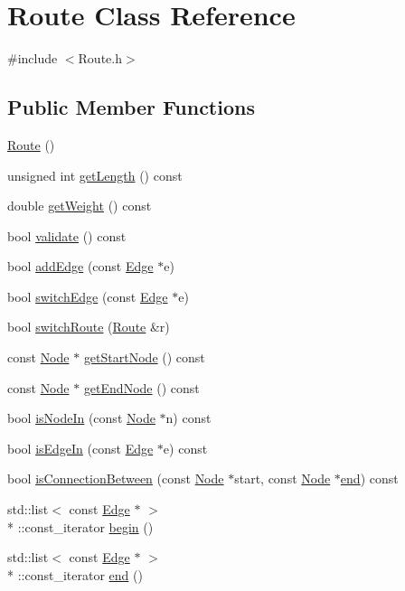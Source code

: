 \hypertarget{classRoute}{\section{Route Class Reference}
\label{classRoute}
}


{\ttfamily \#include $<$Route.\+h$>$}

\subsection*{Public Member Functions}
\begin{DoxyCompactItemize}
\item 
\hyperlink{classRoute_a2b1c971aaf032109cee8081c97e9b9e9}{Route} ()
\item 
unsigned int \hyperlink{classRoute_a105c4a307e39f001686fda75f86ab706}{get\+Length} () const 
\item 
double \hyperlink{classRoute_a29e42745f757af5e569da3a027cdb553}{get\+Weight} () const 
\item 
bool \hyperlink{classRoute_ab563e782ab31226e1aac4d8fabe2c54e}{validate} () const 
\item 
bool \hyperlink{classRoute_a49e8426003ed1372316ebf2f7c30bc10}{add\+Edge} (const \hyperlink{classEdge}{Edge} $\ast$e)
\item 
bool \hyperlink{classRoute_a36c62fabee1b7f0abe369963b5822b72}{switch\+Edge} (const \hyperlink{classEdge}{Edge} $\ast$e)
\item 
bool \hyperlink{classRoute_a5d04589bb4d49348d10eb953545f9a31}{switch\+Route} (\hyperlink{classRoute}{Route} \&r)
\item 
const \hyperlink{classNode}{Node} $\ast$ \hyperlink{classRoute_a4898ca33d504f3ac76967183e4bea3ca}{get\+Start\+Node} () const 
\item 
const \hyperlink{classNode}{Node} $\ast$ \hyperlink{classRoute_a58761414ce3ccbf662226f8513236941}{get\+End\+Node} () const 
\item 
bool \hyperlink{classRoute_abbc3d9f0eb9e4e867c61d59a1d1c5714}{is\+Node\+In} (const \hyperlink{classNode}{Node} $\ast$n) const 
\item 
bool \hyperlink{classRoute_a3743e49214c67c7aacc92bf3a064569e}{is\+Edge\+In} (const \hyperlink{classEdge}{Edge} $\ast$e) const 
\item 
bool \hyperlink{classRoute_ad29878261b38528b528cd499ab532169}{is\+Connection\+Between} (const \hyperlink{classNode}{Node} $\ast$start, const \hyperlink{classNode}{Node} $\ast$\hyperlink{classRoute_a9b0d7f619cd6f518e7e5d3532929b181}{end}) const 
\item 
std\+::list$<$ const \hyperlink{classEdge}{Edge} $\ast$ $>$\\*
\+::const\+\_\+iterator \hyperlink{classRoute_a4211f37393f1feefdd99e48aefe54e70}{begin} ()
\item 
std\+::list$<$ const \hyperlink{classEdge}{Edge} $\ast$ $>$\\*
\+::const\+\_\+iterator \hyperlink{classRoute_a9b0d7f619cd6f518e7e5d3532929b181}{end} ()
\end{DoxyCompactItemize}
